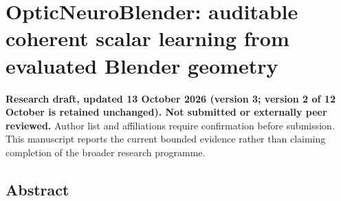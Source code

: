 \documentclass[
  10pt,
]{article}
\author{}
\date{}
\begin{document}
\hypertarget{opticneuroblender-auditable-coherent-scalar-learning-from-evaluated-blender-geometry}{%
\section{OpticNeuroBlender: auditable coherent scalar learning from
evaluated Blender
geometry}\label{opticneuroblender-auditable-coherent-scalar-learning-from-evaluated-blender-geometry}}

\textbf{Research draft, updated 13 October 2026 (version 3; version 2 of
12 October is retained unchanged). Not submitted or externally peer
reviewed.} Author list and affiliations require confirmation before
submission. This manuscript reports the current bounded evidence rather
than claiming completion of the broader research programme.

\hypertarget{abstract}{%
\subsection{Abstract}\label{abstract}}
\end{document}
